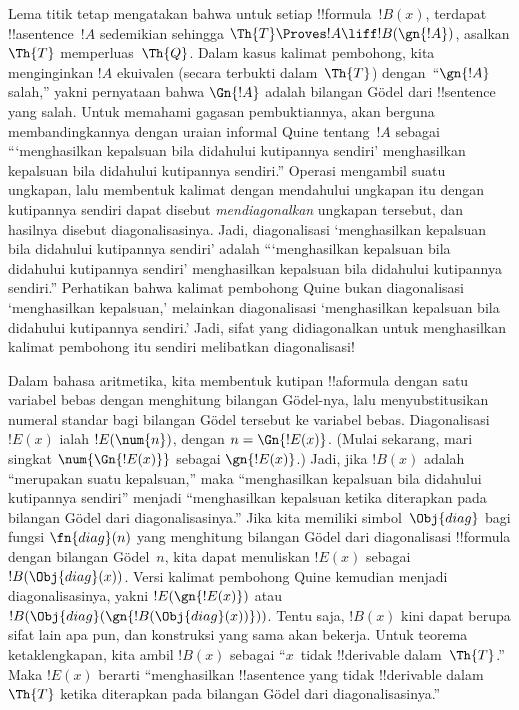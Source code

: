\documentclass[../../../include/open-logic-section]{subfiles}
\begin{document}


\begin{explain}
Lema titik tetap mengatakan bahwa untuk setiap !!{formula}~$!B(x)$, terdapat
!!a{sentence}~$!A$ sedemikian sehingga $\Th{T} \Proves !A \liff
!B(\gn{!A})$, asalkan $\Th{T}$ memperluas~$\Th{Q}$. Dalam kasus kalimat
pembohong, kita menginginkan $!A$ ekuivalen (secara terbukti
dalam~$\Th{T}$) dengan~``$\gn{!A}$ salah,'' yakni pernyataan bahwa
$\Gn{!A}$ adalah bilangan G\"odel dari !!{sentence} yang salah. Untuk
memahami gagasan pembuktiannya, akan berguna membandingkannya dengan uraian
informal Quine tentang~$!A$ sebagai ``{}`menghasilkan kepalsuan bila didahului
kutipannya sendiri' menghasilkan kepalsuan bila didahului kutipannya
sendiri.'' Operasi mengambil suatu ungkapan, lalu membentuk kalimat dengan
mendahului ungkapan itu dengan kutipannya sendiri dapat disebut
\emph{mendiagonalkan} ungkapan tersebut, dan hasilnya disebut
diagonalisasinya. Jadi, diagonalisasi `menghasilkan kepalsuan bila didahului
kutipannya sendiri' adalah ``{}`menghasilkan kepalsuan bila didahului
kutipannya sendiri' menghasilkan kepalsuan bila didahului kutipannya
sendiri.'' Perhatikan bahwa kalimat pembohong Quine bukan diagonalisasi
`menghasilkan kepalsuan,' melainkan diagonalisasi `menghasilkan kepalsuan
bila didahului kutipannya sendiri.' Jadi, sifat yang didiagonalkan untuk
menghasilkan kalimat pembohong itu sendiri melibatkan diagonalisasi!{}

Dalam bahasa aritmetika, kita membentuk kutipan !!a{formula} dengan satu
variabel bebas dengan menghitung bilangan G\"odel-nya, lalu menyubstitusikan
numeral standar bagi bilangan G\"odel tersebut ke variabel bebas.
Diagonalisasi~$!E(x)$ ialah $!E(\num{n})$, dengan $n = \Gn{!E(x)}$.
(Mulai sekarang, mari singkat $\num{\Gn{!E(x)}}$ sebagai $\gn{!E(x)}$.)
Jadi, jika $!B(x)$ adalah ``merupakan suatu kepalsuan,'' maka ``menghasilkan
kepalsuan bila didahului kutipannya sendiri'' menjadi ``menghasilkan
kepalsuan ketika diterapkan pada bilangan G\"odel dari diagonalisasinya.''
Jika kita memiliki simbol~$\Obj{diag}$ bagi fungsi $\fn{diag}(n)$ yang
menghitung bilangan G\"odel dari diagonalisasi !!{formula} dengan bilangan
G\"odel~$n$, kita dapat menuliskan $!E(x)$ sebagai
$!B(\Obj{diag}(x))$. Versi kalimat pembohong Quine kemudian menjadi
diagonalisasinya, yakni $!E(\gn{!E(x)})$ atau
$!B(\Obj{diag}(\gn{!B(\Obj{diag}(x))}))$. Tentu saja, $!B(x)$ kini dapat
berupa sifat lain apa pun, dan konstruksi yang sama akan bekerja. Untuk
teorema ketaklengkapan, kita ambil $!B(x)$ sebagai ``$x$~tidak
!!{derivable} dalam~$\Th{T}$.'' Maka $!E(x)$ berarti ``menghasilkan
!!a{sentence} yang tidak !!{derivable} dalam~$\Th{T}$ ketika diterapkan pada
bilangan G\"odel dari diagonalisasinya.''


\end{explain}
\end{document}
